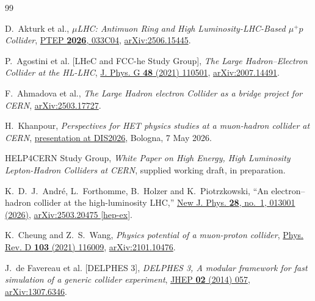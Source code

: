 \begin{thebibliography}{99}

D.~Akturk et al., \emph{$\mu$LHC: Antimuon Ring and High Luminosity-LHC-Based $\mu^+p$ Collider},
\href{https://doi.org/10.1093/ptep/ptag031}{PTEP \textbf{2026}, 033C04},
\href{https://arxiv.org/abs/2506.15445}{arXiv:2506.15445}.



P.~Agostini et al. [LHeC and FCC-he Study Group], \emph{The Large Hadron--Electron Collider at the HL-LHC},
\href{https://doi.org/10.1088/1361-6471/abf3ba}{J. Phys. G \textbf{48} (2021) 110501},
\href{https://arxiv.org/abs/2007.14491}{arXiv:2007.14491}.



F.~Ahmadova et al., \emph{The Large Hadron electron Collider as a bridge project for CERN},
\href{https://arxiv.org/abs/2503.17727}{arXiv:2503.17727}.



H.~Khanpour, \emph{Perspectives for HET physics studies at a muon-hadron collider at CERN},
\href{https://agenda.infn.it/event/47074/contributions/289107/}{presentation at DIS2026},
Bologna, 7 May 2026.



HELP4CERN Study Group, \emph{White Paper on High Energy, High Luminosity Lepton-Hadron Colliders at CERN},
supplied working draft, in preparation.



K.~D.~J.~Andr{\'e}, L.~Forthomme, B.~Holzer and K.~Piotrzkowski,
``An electron--hadron collider at the high-luminosity LHC,''
\href{https://doi.org/10.1088/1367-2630/ae2e31}
{New J. Phys. \textbf{28}, no.~1, 013001 (2026)},
\href{https://arxiv.org/abs/2503.20475}
{arXiv:2503.20475 [hep-ex]}.


K.~Cheung and Z.~S.~Wang, \emph{Physics potential of a muon-proton collider},
\href{https://doi.org/10.1103/PhysRevD.103.116009}{Phys. Rev. D \textbf{103} (2021) 116009},
\href{https://arxiv.org/abs/2101.10476}{arXiv:2101.10476}.



J.~de Favereau et al. [DELPHES 3], \emph{DELPHES 3, A modular framework for fast simulation of a generic collider experiment},
\href{https://doi.org/10.1007/JHEP02(2014)057}{JHEP \textbf{02} (2014) 057},
\href{https://arxiv.org/abs/1307.6346}{arXiv:1307.6346}.





\end{thebibliography}
